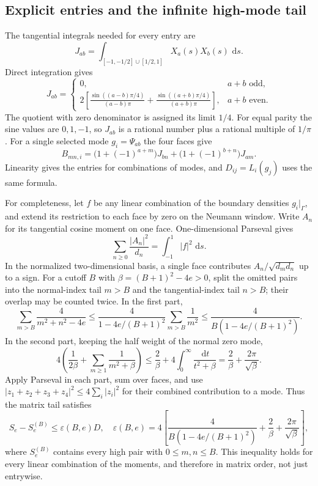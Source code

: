 \documentclass[11pt,reqno]{amsart}
\numberwithin{equation}{section}
\newcommand{\dd}{\,\mathrm d}
\newcommand{\abs}[1]{\lvert#1\rvert}
\begin{document}
\subsection{Explicit entries and the infinite high-mode tail}

The tangential integrals needed for every entry are
\[
 J_{ab}=\int_{[-1,-1/2]\cup[1/2,1]}X_a(s)X_b(s)\,\dd s.
\]
Direct integration gives
\begin{equation}
 J_{ab}=\begin{cases}
 0,&a+b\text{ odd},\\[2pt]
 \displaystyle 2\left[
 \frac{\sin((a-b)\pi/4)}{(a-b)\pi}
 +\frac{\sin((a+b)\pi/4)}{(a+b)\pi}\right],
 &a+b\text{ even}.
 \end{cases}
 \label{df:J}
\end{equation}
The quotient with zero denominator is assigned its limit $1/4$.
For equal parity the sine values are $0,1,-1$, so $J_{ab}$ is a
rational number plus a rational multiple of $1/\pi$.
For a single selected mode $g_i=\Psi_{ab}$ the four faces give
\begin{equation}
 B_{mn,i}=
 \bigl(1+(-1)^{a+m}\bigr)J_{bn}
 +\bigl(1+(-1)^{b+n}\bigr)J_{am}.
 \label{df:coupling}
\end{equation}
Linearity gives the entries for combinations of modes, and
$D_{ij}=L_i(g_j)$ uses the same formula.

For completeness, let $f$ be any linear combination of the boundary
densities $g_i|_\Gamma$, and extend its restriction to each face by zero
on the Neumann window. Write $A_n$ for its tangential cosine moment on
one face. One-dimensional Parseval gives
\[
 \sum_{n\ge0}\frac{\abs{A_n}^2}{d_n}
 =\int_{-1}^1\abs f^2\,\dd s.
\]
In the normalized two-dimensional basis, a single face contributes
$A_n/\sqrt{d_md_n}$ up to a sign. For a cutoff $B$ with
$\beta=(B+1)^2-4e>0$, split the omitted pairs into the normal-index
tail $m>B$ and the tangential-index tail $n>B$; their overlap may be
counted twice. In the first part,
\[
 \sum_{m>B}\frac{4}{m^2+n^2-4e}
 \le\frac{4}{1-4e/(B+1)^2}\sum_{m>B}\frac1{m^2}
 \le\frac{4}{B(1-4e/(B+1)^2)}.
\]
In the second part, keeping the half weight of the normal zero mode,
\[
 4\left(\frac1{2\beta}+\sum_{m\ge1}\frac1{m^2+\beta}\right)
 \le\frac2\beta+4\int_0^\infty\frac{\dd t}{t^2+\beta}
 =\frac2\beta+\frac{2\pi}{\sqrt\beta}.
\]
Apply Parseval in each part, sum over faces, and use
$\abs{z_1+z_2+z_3+z_4}^2\le4\sum_i\abs{z_i}^2$ for their combined
contribution to a mode. Thus the matrix tail satisfies
\begin{equation}
 S_e-S_e^{(B)}\le\varepsilon(B,e)D,
 \quad
 \varepsilon(B,e)=4\left[
 \frac{4}{B(1-4e/(B+1)^2)}
 +\frac2\beta+\frac{2\pi}{\sqrt\beta}\right],
 \label{df:complete-tail}
\end{equation}
where $S_e^{(B)}$ contains every high pair with $0\le m,n\le B$.
This inequality holds for every linear combination of the moments,
and therefore in matrix order, not just entrywise.
\end{document}

